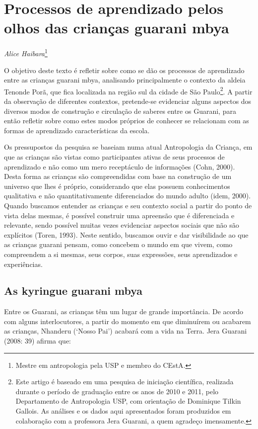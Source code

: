 \chapter{Processos de aprendizado pelos olhos das crianças guarani mbya}
\begin{flushright}
\emph{Alice Haibara}\footnote{Mestre em antropologia pela USP e membro do
CEstA.}
\end{flushright}

O objetivo deste texto é refletir sobre como se dão os processos de
aprendizado entre as crianças guarani mbya, analisando principalmente o
contexto da aldeia Tenonde Porã, que fica localizada na região sul da
cidade de São Paulo\footnote{Este artigo é baseado em uma pesquisa de
iniciação científica, realizada durante o período de graduação entre os
anos de 2010 e 2011, pelo Departamento de Antropologia USP, com
orientação de Dominique Tilkin Gallois. As análises e os dados aqui
apresentados foram produzidos em colaboração com a professora Jera
Guarani, a quem agradeço imensamente.}. A partir da observação de
diferentes contextos, pretende-se evidenciar alguns aspectos dos
diversos modos de construção e circulação de saberes entre os Guarani,
para então refletir sobre como estes modos próprios de conhecer se
relacionam com as formas de aprendizado características da escola.

Os pressupostos da pesquisa se baseiam numa atual Antropologia da
Criança, em que as crianças são vistas como participantes ativas de
seus processos de aprendizado e não como um mero receptáculo de
informações (Cohn, 2000). Desta forma as crianças são compreendidas com
base na construção de um universo que lhes é próprio, considerando que
elas possuem conhecimentos qualitativa e não quantitativamente
diferenciados do mundo adulto (idem, 2000). Quando buscamos entender as
crianças e seu contexto social a partir do ponto de vista delas mesmas,
é possível construir uma apreensão que é diferenciada e relevante,
sendo possível muitas vezes evidenciar aspectos sociais que não são
explícitos (Toren, 1993). Neste sentido, buscamos ouvir e dar
visibilidade ao que as crianças guarani pensam, como concebem o mundo
em que vivem, como compreendem a si mesmas, seus corpos, suas
expressões, seus aprendizados e experiências. 

\section{As kyringue guarani mbya}
Entre os Guarani, as crianças têm um lugar de grande importância. De
acordo com alguns interlocutores, a partir do momento em que diminuírem
ou acabarem as crianças, Nhanderu (‘Nosso Pai’) acabará com a vida na
Terra. Jera Guarani (2008: 39) afirma que:

